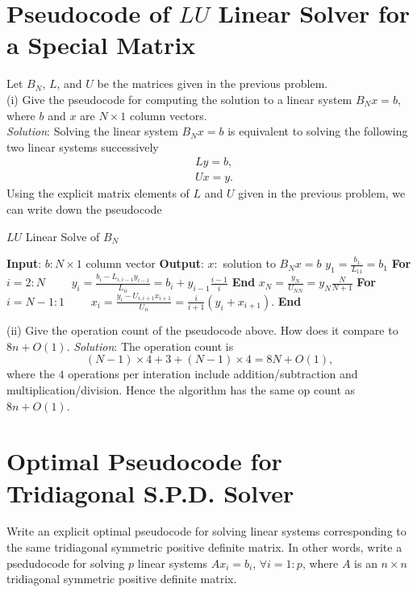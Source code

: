 \documentclass[paper=a4, fontsize=11pt]{scrartcl} %
\numberwithin{equation}{section} %
\numberwithin{figure}{section} %
\numberwithin{table}{section} %
\begin{document}
\section{Pseudocode of $LU$ Linear Solver for a Special Matrix}
Let $B_N$, $L$, and $U$ be the matrices given in the previous problem.\\
(i) Give the pseudocode for computing the solution to a linear system $B_N x =b$, where $b$ and $x$ are $N\times 1$ column vectors.\\
\textit{Solution}: Solving the linear system $B_N x =b$ is equivalent to solving the following two linear systems successively
\begin{align}
\nonumber & L y = b,\\
\nonumber & U x = y.
\end{align}
Using the explicit matrix elements of $L$ and $U$ given in the previous problem, we can write down the pseudocode
\begin{algorithm}
\caption{$LU$ Linear Solve of $B_N$}\label{lulsb}
\begin{algorithmic}
\STATE \textbf{Input}: $b: N\times 1$ column vector
\STATE \textbf{Output}: $x: $ solution to $B_N x =b$
\STATE $y_1 = \frac{b_1}{L_{11}}= b_1$
\STATE \textbf{For} $i=2:N$
    \STATE $\quad\quad y_i = \frac{b_i - L_{i,i-1}y_{i-1}}{L_{ii}}= b_i + y_{i-1}\frac{i-1}{i}$
\STATE \textbf{End}
\STATE $x_N =\frac{y_N}{U_{NN}} = y_N\frac{N}{N+1}$
\STATE \textbf{For} $i=N-1:1$
    \STATE $\quad\quad x_i = \frac{y_i - U_{i,i+1}x_{i+1}}{U_{ii}} = \frac{i}{i+1} \left(y_i + x_{i+1}\right).$
\STATE \textbf{End}
\end{algorithmic}
\end{algorithm}

(ii) Give the operation count of the pseudocode above. How does it compare to $8n+O(1)$.
\textit{Solution}: The operation count is
$$
 (N-1)\times 4 + 3 + (N-1)\times 4 = 8N + O(1),
$$
where the $4$ operations per interation include addition/subtraction and multiplication/division. Hence the algorithm has the same op count as $8n+O(1)$.

\newpage

\section{Optimal Pseudocode for Tridiagonal S.P.D. Solver}
Write an explicit optimal pseudocode for solving linear systems corresponding to
the same tridiagonal symmetric positive definite matrix. In other words, write a
psedudocode for solving $p$ linear systems $Ax_i = b_i$, $\forall i=1:p$, where $A$
is an $n\times n$ tridiagonal symmetric positive definite matrix.\\
\end{document}
